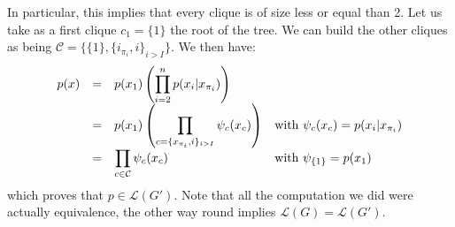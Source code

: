 \documentclass[10pt]{article}
\begin{document}
\begin{itemize}
In particular, this implies that every clique is of size less or equal than 2. Let us take as a first clique $c_1 = \{ 1 \}$ the root of the tree. We can build the other cliques as being $\mathcal{C} = \{ \{1\}, \{i_{\pi_i}, i\}_{i > I} \}$. We then have:
\begin{equation}
\begin{array}{r l l l}
p(x) & = & \displaystyle p(x_1) \left( \prod_{i=2}^n p(x_i | x_{\pi_i}) \right) & \\
		 & = & \displaystyle p(x_1) \left( \prod_{c = \{x_{\pi_i}, i\}_{i > I}} \psi_c(x_c) \right) & \text{with } \psi_c (x_c) = p(x_i | x_{\pi_i}) \\
		 & = & \displaystyle \prod_{c\in\mathcal{C}} \psi_c(x_c) & \text{with } \psi_{\{1\}} = p(x_1) 
\end{array}
\label{eq:}
\end{equation}
which proves that $p\in\mathcal{L}(G')$. Note that all the computation we did were actually equivalence, the other way round implies $\mathcal{L}(G) = \mathcal{L}(G')$.

\end{itemize}
\end{document}
